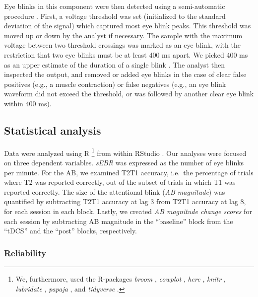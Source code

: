 \documentclass[11pt,english,]{memoir}
\let\rmarkdownfootnote\footnote%
\def\footnote{\protect\rmarkdownfootnote}
\begin{document}
Eye blinks in this component were then detected using a semi-automatic procedure \autocites[cf.][]{Slagter2013}{Kruis2016}. First, a voltage threshold was set (initialized to the standard deviation of the signal) which captured most eye blink peaks. This threshold was moved up or down by the analyst if necessary. The sample with the maximum voltage between two threshold crossings was marked as an eye blink, with the restriction that two eye blinks must be at least 400 ms apart. We picked 400 ms as an upper estimate of the duration of a single blink \autocite{Caffier2003}. The analyst then inspected the output, and removed or added eye blinks in the case of clear false positives (e.g., a muscle contraction) or false negatives (e.g., an eye blink waveform did not exceed the threshold, or was followed by another clear eye blink within 400 ms).

\hypertarget{AB_sEBR-stats}{%
\subsection{Statistical analysis}\label{AB_sEBR-stats}}

Data were analyzed using R \autocite[Version 3.5.1;][]{R-base}\footnote{We, furthermore, used the R-packages \emph{broom} \autocite[Version 0.5.1;][]{R-broom}, \emph{cowplot} \autocite[Version 0.9.99;][]{R-cowplot}, \emph{here} \autocite[Version 0.1;][]{R-here}, \emph{knitr} \autocite[Version 1.21;][]{R-knitr}, \emph{lubridate} \autocite[Version 1.7.4;][]{R-lubridate}, \emph{papaja} \autocite[Version 0.1.0.9842;][]{R-papaja}, and \emph{tidyverse} \autocite[Version 1.2.1;][]{R-tidyverse}.} from within RStudio \autocite[Version 1.1.463;][]{RStudio2016}. Our analyses were focused on three dependent variables. \emph{sEBR} was expressed as the number of eye blinks per minute. For the AB, we examined T2\textbar{}T1 accuracy, i.e.~the percentage of trials where T2 was reported correctly, out of the subset of trials in which T1 was reported correctly. The size of the attentional blink (\emph{AB magnitude}) was quantified by subtracting T2\textbar{}T1 accuracy at lag 3 from T2\textbar{}T1 accuracy at lag 8, for each session in each block. Lastly, we created \emph{AB magnitude change scores} for each session by subtracting AB magnitude in the ``baseline'' block from the ``tDCS'' and the ``post'' blocks, respectively.

\hypertarget{AB_sEBR-methods-rel}{%
\subsubsection{Reliability}\label{AB_sEBR-methods-rel}}
\end{document}

